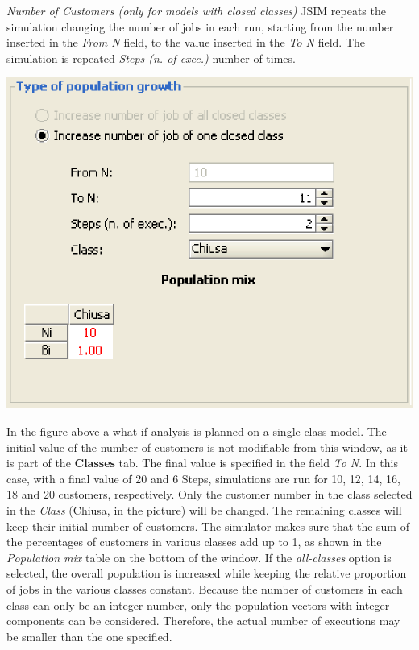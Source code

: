 \begin{description*}
\textit{Number of Customers (only for models with closed classes)}
JSIM repeats the simulation changing the number of jobs in each run,
starting from the number inserted in the \emph{From N} field, to the value inserted
in the \emph{To N} field. The simulation is repeated \emph{Steps (n. of exec.)} number of times.
\begin{center}
\includegraphics[scale=.5]{img/jsim/customers.eps}
\end{center}
In the figure above a what-if analysis is planned on a single class model.
The initial value of the number of customers is not modifiable from this window, as it is part of the \textbf{Classes} tab. The final value is specified in the field \emph{To N}. In this case, with a final value
of 20 and 6 Steps, simulations are run for 10, 12, 14, 16, 18 and 20 customers, respectively. Only the customer number in the class selected in the \emph{Class} (Chiusa, in the picture) will be changed. The remaining classes will keep their initial number of customers. The simulator makes sure that the sum of the percentages of customers in various classes add up to 1, as shown in the \emph{Population mix} table on the bottom of the window.
If the \emph{all-classes} option is selected, the overall population is increased while keeping the relative proportion of jobs in the various classes constant. Because the number of customers in each class can only be an integer number, only the population vectors with integer components can be considered. Therefore, the actual number of executions may be smaller than the one specified.\\\\

\end{description*}
